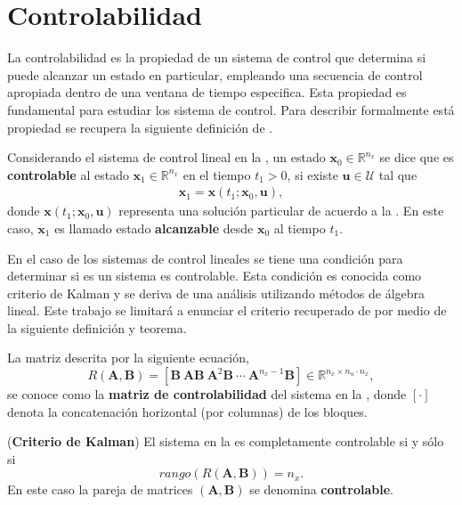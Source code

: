 \section{Controlabilidad}
La controlabilidad es la propiedad de un sistema de control que determina si puede alcanzar un estado en particular, empleando una secuencia de control apropiada dentro de una ventana de tiempo especifica. Esta propiedad es fundamental para estudiar los sistema de control. Para describir formalmente está propiedad se recupera la siguiente definición de \cite{Gruene2021}.

\begin{definition}
    Considerando el sistema de control lineal en la , un estado $\mathbf{x}_0 \in \mathbb{R}^{n_x}$ se dice que es \textbf{controlable} al estado $\mathbf{x}_1\in \mathbb{R}^{n_x}$ en el tiempo $t_1>0$, si existe $\mathbf{u}\in \mathcal{U}$ tal que 
    \begin{align}
        \mathbf{x}_1 = \mathbf{x}(t_1; \mathbf{x}_0, \mathbf{u}),
    \end{align}
    donde $\mathbf{x}(t_1; \mathbf{x}_0, \mathbf{u})$ representa una solución particular de acuerdo a la . En este caso, $\mathbf{x}_1$ es llamado estado \textbf{alcanzable} desde $\mathbf{x}_0$ al tiempo $t_1$.
\end{definition}

En el caso de los sistemas de control lineales se tiene una condición para determinar si es un sistema es controlable. Esta condición es conocida como criterio de Kalman y se deriva de una análisis utilizando métodos de álgebra lineal. Este trabajo se limitará a enunciar el criterio recuperado de \cite{Gruene2021} por medio de la siguiente definición y teorema.

\begin{definition}
    La matriz descrita por la siguiente ecuación, 
    $$R(\mathbf{A}, \mathbf{B}) = [\mathbf{B}\ \mathbf{AB}\ \mathbf{A}^2\mathbf{B}\ \cdots\ \mathbf{A}^{n_x-1}\mathbf{B}] \in \mathbb{R}^{n_x \times n_u\cdot n_x},$$ 
    se conoce como la \textbf{matriz de controlabilidad} del sistema en la , donde $[\cdot]$ denota la concatenación horizontal (por columnas) de los bloques.
\end{definition}

\begin{theorem}(\textbf{Criterio de Kalman})
    El sistema en la  es completamente controlable si y sólo si
    $$rango(R(\mathbf{A}, \mathbf{B})) = n_x.$$
    En este caso la pareja de matrices $(\mathbf{A},\mathbf{B})$ se denomina \textbf{controlable}.
\end{theorem} 

